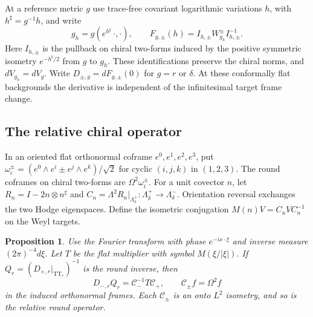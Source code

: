 \documentclass[11pt]{article}
\numberwithin{equation}{section}
\newtheorem{proposition}[theorem]{Proposition}
\theoremstyle{definition}
\theoremstyle{remark}
\begin{document}
At a reference metric \(g\) use trace-free covariant logarithmic
variations \(h\), with \(h^\sharp=g^{-1}h\), and write
\[
 g_h=g(e^{h^\sharp}\,\cdot,\cdot),\qquad
 F_{g,\pm}(h)=I_{h,\pm}W_{g_h}^{\pm}I_{h,\pm}^{-1}.
\]
Here \(I_{h,\pm}\) is the pullback on chiral two-forms induced by
the positive symmetric isometry \(e^{-h^\sharp/2}\) from \(g\) to
\(g_h\). These identifications preserve the chiral norms, and
\(dV_{g_h}=dV_g\). Write \(D_{\pm,g}=dF_{g,\pm}(0)\) for \(g=r\)
or \(\delta\). At these conformally flat backgrounds the derivative is
independent of the infinitesimal target frame change.

\subsection{The relative chiral operator}

In an oriented flat orthonormal coframe \(e^0,e^1,e^2,e^3\), put
\(\omega_i^\pm=(e^0\wedge e^i\pm e^j\wedge e^k)/\sqrt2\) for cyclic
\((i,j,k)\) in \((1,2,3)\). The round coframes on chiral two-forms
are \(\Omega^2\omega_i^\pm\). For a unit covector \(n\), let
\(R_n=I-2n\otimes n^\sharp\) and
\(C_n=\Lambda^2R_n|_{\Lambda_\delta^+}:\Lambda_\delta^+\to\Lambda_\delta^-\).
Orientation reversal exchanges the two Hodge eigenspaces. Define the
isometric conjugation \(M(n)V=C_nVC_n^{-1}\) on the Weyl targets.

\begin{proposition}\label{xfer:multiplier}
Use the Fourier transform with phase \(e^{-ix\cdot\xi}\) and inverse
measure \((2\pi)^{-4}d\xi\). Let \(T\) be the flat multiplier with
symbol \(M(\xi/|\xi|)\). If
\(Q_r=(D_{+,r}|_{\mathrm{TT}_r})^{-1}\) is the round inverse, then
\[
 D_{-,r}Q_r=\mathcal C_-^{-1}T\mathcal C_+,\qquad
 \mathcal C_\pm f=\Omega^2 f
\]
in the induced orthonormal frames. Each \(\mathcal C_\pm\) is an
onto \(L^2\) isometry, and so is the relative round operator.
\end{proposition}
\end{document}

